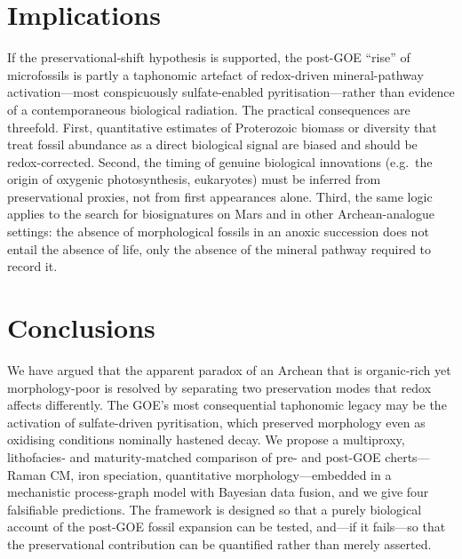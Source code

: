 \documentclass[11pt]{article}
\begin{document}
\section{Implications}

If the preservational-shift hypothesis is supported, the post-GOE ``rise'' of microfossils is
partly a taphonomic artefact of redox-driven mineral-pathway activation---most conspicuously
sulfate-enabled pyritisation---rather than evidence of a contemporaneous biological radiation. The
practical consequences are threefold. First, quantitative estimates of Proterozoic biomass or
diversity that treat fossil abundance as a direct biological signal are biased and should be
redox-corrected. Second, the timing of genuine biological innovations (e.g.\ the origin of
oxygenic photosynthesis, eukaryotes) must be inferred from preservational proxies, not from first
appearances alone. Third, the same logic applies to the search for biosignatures on Mars and in
other Archean-analogue settings: the absence of morphological fossils in an anoxic succession does
not entail the absence of life, only the absence of the mineral pathway required to record it.

\section{Conclusions}

We have argued that the apparent paradox of an Archean that is organic-rich yet morphology-poor is
resolved by separating two preservation modes that redox affects differently. The GOE's most
consequential taphonomic legacy may be the activation of sulfate-driven pyritisation, which
preserved morphology even as oxidising conditions nominally hastened decay. We propose a
multiproxy, lithofacies- and maturity-matched comparison of pre- and post-GOE cherts---Raman CM,
iron speciation, quantitative morphology---embedded in a mechanistic process-graph model with
Bayesian data fusion, and we give four falsifiable predictions. The framework is designed so that
a purely biological account of the post-GOE fossil expansion can be tested, and---if it fails---so
that the preservational contribution can be quantified rather than merely asserted.
\end{document}
